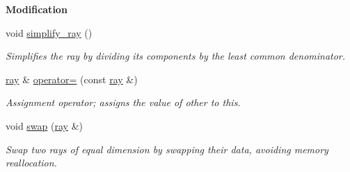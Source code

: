 \begin{Indent}\textbf{ Modification}\par
\begin{DoxyCompactItemize}
\item 
\mbox{\label{classray_a99cfe50a0abd150d7effd8911664c2db}} 
void \hyperlink{classray_a99cfe50a0abd150d7effd8911664c2db}{simplify\+\_\+ray} ()
\begin{DoxyCompactList}\small\item\em Simplifies the ray by dividing its components by the least common denominator. \end{DoxyCompactList}\item 
\hyperlink{classray}{ray} \& \hyperlink{classray_a83fa2d552fda75b973fe659c39ff9960}{operator=} (const \hyperlink{classray}{ray} \&)
\begin{DoxyCompactList}\small\item\em Assignment operator; assigns the value of {\ttfamily other} to {\ttfamily this}. \end{DoxyCompactList}\item 
void \hyperlink{classray_a3f95b591c0b92d2ea8cc04b1c9b0d179}{swap} (\hyperlink{classray}{ray} \&)
\begin{DoxyCompactList}\small\item\em Swap two rays of equal dimension by swapping their data, avoiding memory reallocation. \end{DoxyCompactList}\end{DoxyCompactItemize}
\end{Indent}

